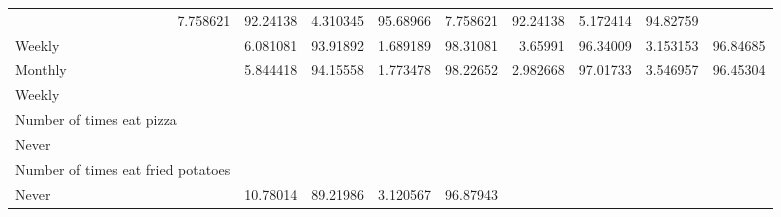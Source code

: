 \documentclass{article}
\begin{document}
\begin{tabular}{lllllllll}
  \multicolumn{1}{|r}{7.758621} &
  \multicolumn{1}{r}{92.24138} &
  \multicolumn{1}{r}{4.310345} &
  \multicolumn{1}{r}{95.68966} &
  \multicolumn{1}{r}{7.758621} &
  \multicolumn{1}{r}{92.24138} &
  \multicolumn{1}{r}{5.172414} &
  \multicolumn{1}{r}{94.82759} \\
\multicolumn{1}{l}{\hspace{5em}Weekly} &
  \multicolumn{1}{|r}{6.081081} &
  \multicolumn{1}{r}{93.91892} &
  \multicolumn{1}{r}{1.689189} &
  \multicolumn{1}{r}{98.31081} &
  \multicolumn{1}{r}{3.65991} &
  \multicolumn{1}{r}{96.34009} &
  \multicolumn{1}{r}{3.153153} &
  \multicolumn{1}{r}{96.84685} \\
\multicolumn{1}{l}{\hspace{5em}Monthly} &
  \multicolumn{1}{|r}{5.844418} &
  \multicolumn{1}{r}{94.15558} &
  \multicolumn{1}{r}{1.773478} &
  \multicolumn{1}{r}{98.22652} &
  \multicolumn{1}{r}{2.982668} &
  \multicolumn{1}{r}{97.01733} &
  \multicolumn{1}{r}{3.546957} &
  \multicolumn{1}{r}{96.45304} \\
\multicolumn{1}{l}{\hspace{1em}Weekly} &
  \multicolumn{1}{|r}{} &
  \multicolumn{1}{r}{} &
  \multicolumn{1}{r}{} &
  \multicolumn{1}{r}{} &
  \multicolumn{1}{r}{} &
  \multicolumn{1}{r}{} &
  \multicolumn{1}{r}{} &
  \multicolumn{1}{r}{} \\
\multicolumn{1}{l}{\hspace{2em}Number of times eat pizza} &
  \multicolumn{1}{|r}{} &
  \multicolumn{1}{r}{} &
  \multicolumn{1}{r}{} &
  \multicolumn{1}{r}{} &
  \multicolumn{1}{r}{} &
  \multicolumn{1}{r}{} &
  \multicolumn{1}{r}{} &
  \multicolumn{1}{r}{} \\
\multicolumn{1}{l}{\hspace{3em}Never} &
  \multicolumn{1}{|r}{} &
  \multicolumn{1}{r}{} &
  \multicolumn{1}{r}{} &
  \multicolumn{1}{r}{} &
  \multicolumn{1}{r}{} &
  \multicolumn{1}{r}{} &
  \multicolumn{1}{r}{} &
  \multicolumn{1}{r}{} \\
\multicolumn{1}{l}{\hspace{4em}Number of times eat fried potatoes} &
  \multicolumn{1}{|r}{} &
  \multicolumn{1}{r}{} &
  \multicolumn{1}{r}{} &
  \multicolumn{1}{r}{} &
  \multicolumn{1}{r}{} &
  \multicolumn{1}{r}{} &
  \multicolumn{1}{r}{} &
  \multicolumn{1}{r}{} \\
\multicolumn{1}{l}{\hspace{5em}Never} &
  \multicolumn{1}{|r}{10.78014} &
  \multicolumn{1}{r}{89.21986} &
  \multicolumn{1}{r}{3.120567} &
  \multicolumn{1}{r}{96.87943} &

\end{tabular}
\end{document}

